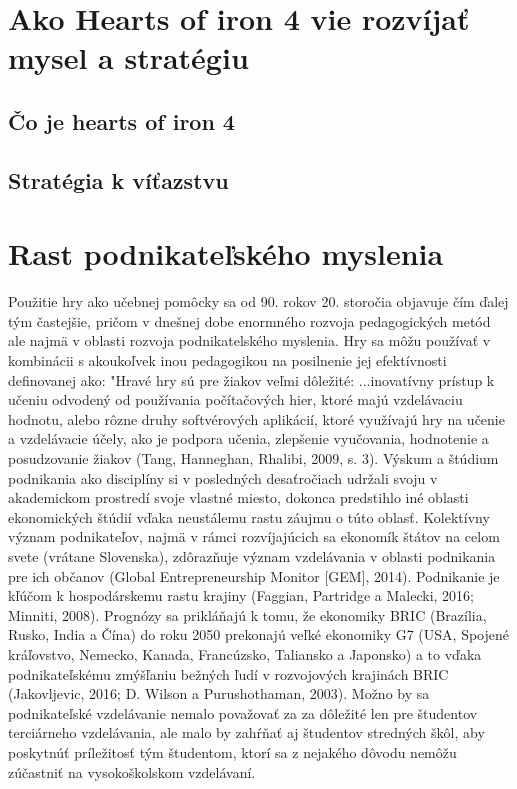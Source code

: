 \documentclass[10pt,oneside,slovak,a4paper]{article}
\begin{document}
\section{Ako Hearts of iron 4 vie rozvíjať mysel a stratégiu}
\subsection{Čo je hearts of iron 4}
\subsection{Stratégia k víťazstvu}
\section{Rast podnikateľského myslenia}

Použitie hry ako učebnej pomôcky sa od 90. rokov 20. storočia objavuje čím ďalej tým častejšie, pričom v dnešnej dobe enormného rozvoja pedagogických metód ale najmä v oblasti rozvoja podnikatelského myslenia.
Hry sa môžu používať v kombinácii s akoukoľvek inou pedagogikou na posilnenie jej 
efektívnosti definovanej ako: "Hravé hry sú pre žiakov veľmi dôležité:
...inovatívny prístup k učeniu odvodený od používania počítačových hier, ktoré majú 
vzdelávaciu hodnotu, alebo rôzne druhy softvérových aplikácií, ktoré využívajú hry na učenie a 
vzdelávacie účely, ako je podpora učenia, zlepšenie vyučovania, hodnotenie a posudzovanie žiakov (Tang, Hanneghan, Rhalibi, 2009, s. 3).
Výskum a štúdium podnikania ako disciplíny si v posledných desaťročiach udržali svoju 
v akademickom prostredí svoje vlastné miesto, dokonca predstihlo iné oblasti ekonomických štúdií vďaka neustálemu rastu 
záujmu o túto oblasť. Kolektívny význam podnikateľov, najmä v rámci rozvíjajúcich sa 
ekonomík štátov na celom svete (vrátane Slovenska), zdôrazňuje význam vzdelávania v oblasti podnikania pre ich občanov (Global Entrepreneurship Monitor [GEM], 2014). Podnikanie je kľúčom k hospodárskemu rastu krajiny (Faggian, Partridge a Malecki, 2016; Minniti, 
2008). Prognózy sa prikláňajú k tomu, že ekonomiky BRIC (Brazília, Rusko, India a Čína) do roku 2050 prekonajú veľké ekonomiky G7 (USA, Spojené kráľovstvo, Nemecko, Kanada, Francúzsko, Taliansko a Japonsko) 
a to vďaka podnikateľskému zmýšľaniu bežných ľudí v rozvojových krajinách BRIC (Jakovljevic, 2016; 
D. Wilson a Purushothaman, 2003). Možno by sa podnikateľské vzdelávanie nemalo považovať za 
za dôležité len pre študentov terciárneho vzdelávania, ale malo by zahŕňať aj študentov stredných škôl, aby 
poskytnúť príležitosť tým študentom, ktorí sa z nejakého dôvodu nemôžu zúčastniť na vysokoškolskom vzdelávaní.
\end{document}
